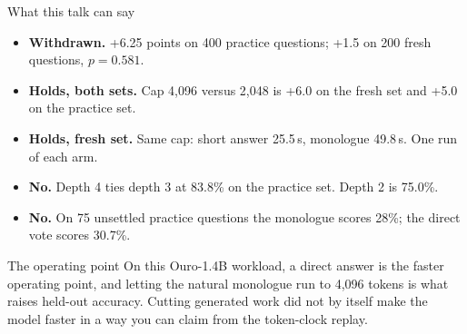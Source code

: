 \documentclass[aspectratio=169,11pt]{beamer}
\begin{document}
\begin{frame}{What this talk can say}
  \scriptsize
  \begin{itemize}\setlength\itemsep{0.7em}
    \item \textcolor{bad}{\textbf{Withdrawn.}}
          +6.25 points on 400 practice questions; +1.5 on 200 fresh questions, $p = 0.581$.
    \item \textcolor{good}{\textbf{Holds, both sets.}}
          Cap 4{,}096 versus 2{,}048 is +6.0 on the fresh set and +5.0 on the practice set.
    \item \textcolor{accent}{\textbf{Holds, fresh set.}}
          Same cap: short answer 25.5\,s, monologue 49.8\,s. One run of each arm.
    \item \textbf{No.}
          Depth 4 ties depth 3 at 83.8\% on the practice set. Depth 2 is 75.0\%.
    \item \textbf{No.}
          On 75 unsettled practice questions the monologue scores 28\%; the direct vote scores 30.7\%.
  \end{itemize}
  \vspace{0.35em}
  \begin{exampleblock}{The operating point}
    \small On this Ouro-1.4B workload, a direct answer is the faster operating point, and letting
    the natural monologue run to 4{,}096 tokens is what raises held-out accuracy.
    Cutting generated work did not by itself make the model faster in a way you can claim from the token-clock replay.
  \end{exampleblock}
\end{frame}
\end{document}
